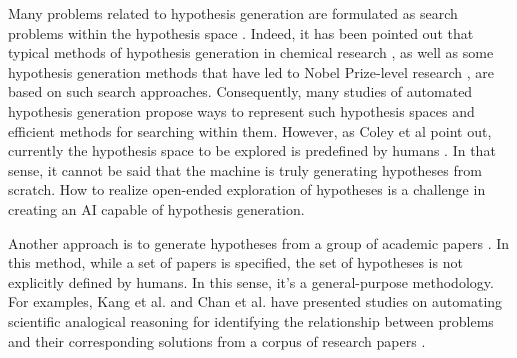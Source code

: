Many problems related to hypothesis generation are formulated as search problems within the hypothesis space \cite{langley1987scientific}. Indeed, it has been pointed out that typical methods of hypothesis generation in chemical research \cite{coley2020autonomous}, as well as some hypothesis generation methods that have led to Nobel Prize-level research \cite{kitano2021nobel}, are based on such search approaches. Consequently, many studies of automated hypothesis generation propose ways to represent such hypothesis spaces and efficient methods for searching within them. However, as Coley et al point out, currently the hypothesis space to be explored is predefined by humans \cite{coley2020autonomousII}. In that sense, it cannot be said that the machine is truly generating hypotheses from scratch. How to realize open-ended exploration of hypotheses is a challenge in creating an AI capable of hypothesis generation.



Another approach is to generate hypotheses from a group of academic papers \cite{kang2022augmenting,chan2018solvent,wang2023learning,xu2023exploring}. In this method, while a set of papers is specified, the set of hypotheses is not explicitly defined by humans. In this sense, it's a general-purpose methodology. For examples, Kang et al. and Chan et al. have presented studies on automating scientific analogical reasoning for identifying the relationship between problems and their corresponding solutions from a corpus of research papers \cite{kang2022augmenting,chan2018solvent}.






